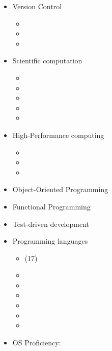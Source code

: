 \documentclass{CurriculumVitae}[10pt, draft, condensed]
\begin{document}
\begin{multicols}{4}
  \begin{itemize}[topsep=0pt]
    \setlength{\itemsep}{-0.3em}
  \item {\footnotesize Version Control}
    \begin{itemize}[topsep=0pt, partopsep=0pt]
      \setlength{\itemsep}{-0.3em}
    \item {}
    \item {}
    \item {}
    \end{itemize}
  \item {\footnotesize Scientific computation}
    \begin{itemize}[topsep=0pt, partopsep=0pt]
      \setlength{\itemsep}{-0.3em}
    \item {}
    \item {}
    \item {}
    \item {}
    \item {}
    \end{itemize}
  \item {\footnotesize High-Performance computing}
    \begin{itemize}[topsep=0pt, partopsep=0pt]
      \setlength{\itemsep}{-0.3em}
    \item {}
    \item {}
    \item {}
    \end{itemize}
  \item {\footnotesize Object-Oriented Programming}
  \item {\footnotesize Functional Programming}
  \item {\footnotesize Test-driven development}
  \item {\footnotesize Programming languages}
    \begin{itemize}[topsep=0pt, partopsep=0pt]
      \setlength{\itemsep}{-0.3em}
    \item {} (17)
    \item {}
    \item {}
    \item {}
    \item {}
    \item {}
    \item {}
    \end{itemize}
  \item {\footnotesize OS Proficiency:}

\end{itemize}
\end{multicols}
\end{document}
